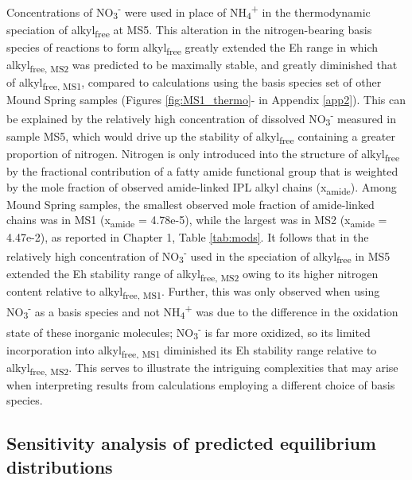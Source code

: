 Concentrations of NO\textsubscript{3}\textsuperscript{-} were used in place of NH\textsubscript{4}\textsuperscript{+} in the thermodynamic speciation of alkyl\textsubscript{free} at MS5. This alteration in the nitrogen-bearing basis species of reactions to form alkyl\textsubscript{free} greatly extended the Eh range in which alkyl\textsubscript{free, MS2} was predicted to be maximally stable, and greatly diminished that of alkyl\textsubscript{free, MS1}, compared to calculations using the basis species set of other Mound Spring samples (Figures \ref{fig:MS1_thermo}- in Appendix \ref{app2}). This can be explained by the relatively high concentration of dissolved NO\textsubscript{3}\textsuperscript{-} measured in sample MS5, which would drive up the stability of alkyl\textsubscript{free} containing a greater proportion of nitrogen. Nitrogen is only introduced into the structure of alkyl\textsubscript{free} by the fractional contribution of a fatty amide functional group that is weighted by the mole fraction of observed amide-linked IPL alkyl chains (x\textsubscript{amide}). Among Mound Spring samples, the smallest observed mole fraction of amide-linked chains was in MS1 (x\textsubscript{amide} = 4.78e-5), while the largest was in MS2 (x\textsubscript{amide} = 4.47e-2), as reported in Chapter 1, Table \ref{tab:mods}. It follows that in the relatively high concentration of NO\textsubscript{3}\textsuperscript{-} used in the speciation of alkyl\textsubscript{free} in MS5 extended the Eh stability range of alkyl\textsubscript{free, MS2} owing to its higher nitrogen content relative to alkyl\textsubscript{free, MS1}. Further, this was only observed when using NO\textsubscript{3}\textsuperscript{-} as a basis species and not NH\textsubscript{4}\textsuperscript{+} was due to the difference in the oxidation state of these inorganic molecules; NO\textsubscript{3}\textsuperscript{-} is far more oxidized, so its limited incorporation into alkyl\textsubscript{free, MS1} diminished its Eh stability range relative to alkyl\textsubscript{free, MS2}. This serves to illustrate the intriguing complexities that may arise when interpreting results from calculations employing a different choice of basis species.


\subsection{Sensitivity analysis of predicted equilibrium distributions}

